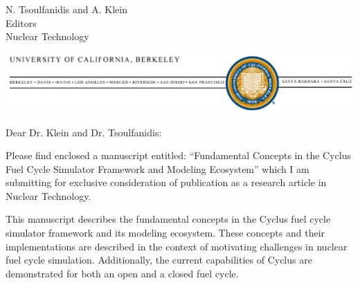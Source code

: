 \documentclass[10pt]{letter} %
\begin{document}

\begin{letter}{N. Tsoulfanidis and A. Klein\\
Editors\\
Nuclear Technology}


\begin{center}
\includegraphics[width=\textwidth]{bk_logo.eps}
\end{center}

\address{Department of Nuclear Engineering\\
4155 Etcheverry Hall\\
MC 1730\\
University of California, Berkeley\\
Berkeley, CA 94720-1730}



\opening{Dear Dr. Klein and Dr. Tsoulfanidis:}

Please find enclosed a manuscript entitled: ``Fundamental Concepts in the
Cyclus Fuel Cycle Simulator Framework and Modeling Ecosystem'' which I am
submitting for exclusive consideration of publication as a research article in
Nuclear Technology.

This manuscript describes the fundamental concepts in the Cyclus fuel cycle
simulator framework and its modeling ecosystem. These concepts and their
implementations are described in the context of motivating challenges in
nuclear fuel cycle simulation. Additionally, the current capabilities of Cyclus
are demonstrated for both an open and a closed fuel cycle.


\end{letter}
\end{document}
